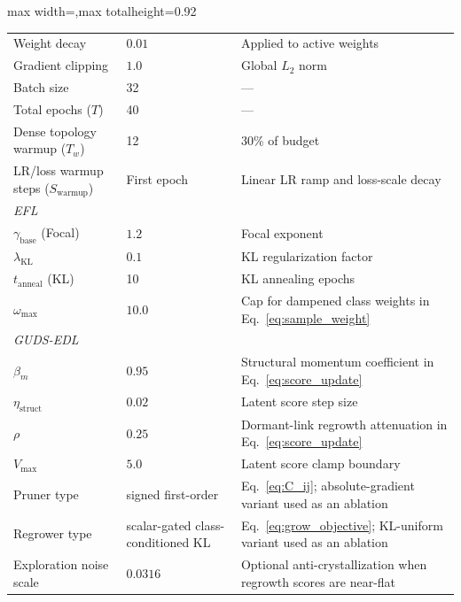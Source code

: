 \documentclass[letterpaper]{article} %
\begin{document}
\begin{table}[H]
\begin{adjustbox}{max width=\columnwidth,max totalheight=0.92\textheight}
\begin{tabular}{@{}p{}p{}p{}@{}}
Weight decay & $0.01$ & Applied to active weights \\
Gradient clipping & $1.0$ & Global $L_2$ norm \\
Batch size & 32 & --- \\
Total epochs ($T$) & 40 & --- \\
Dense topology warmup ($T_w$) & 12 & 30\% of budget \\
LR/loss warmup steps ($S_{\text{warmup}}$) & First epoch & Linear LR ramp and loss-scale decay \\
\midrule
\multicolumn{3}{l}{\emph{EFL}} \\
$\gamma_{\text{base}}$ (Focal) & $1.2$ & Focal exponent \\
$\lambda_{\text{KL}}$ & $0.1$ & KL regularization factor \\
$t_{\text{anneal}}$ (KL) & 10 & KL annealing epochs \\
$\omega_{\max}$ & $10.0$ & Cap for dampened class weights in Eq.~\ref{eq:sample_weight} \\
\midrule
\multicolumn{3}{l}{\emph{GUDS-EDL}} \\
$\beta_m$ & $0.95$ & Structural momentum coefficient in Eq.~\ref{eq:score_update} \\
$\eta_{\text{struct}}$ & $0.02$ & Latent score step size \\
$\rho$ & $0.25$ & Dormant-link regrowth attenuation in Eq.~\ref{eq:score_update} \\
$V_{\max}$ & $5.0$ & Latent score clamp boundary \\
Pruner type & signed first-order & Eq.~\ref{eq:C_ij}; absolute-gradient variant used as an ablation \\
Regrower type & scalar-gated class-conditioned KL & Eq.~\ref{eq:grow_objective}; KL-uniform variant used as an ablation \\
Exploration noise scale & $0.0316$ & Optional anti-crystallization when regrowth scores are near-flat \\
\bottomrule
\end{tabular}
\end{adjustbox}
\end{table}

\FloatBarrier
\end{document}
